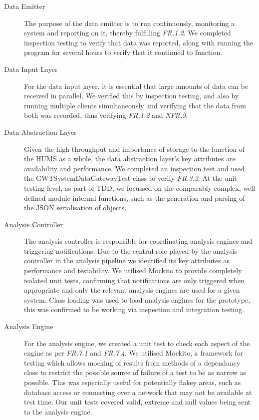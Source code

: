 \documentclass[10pt,a4paper]{article}
\newcommand{\frit}[1]{\textit{FR.#1}}
\newcommand{\nfrit}[1]{\textit{NFR.#1}}
\begin{document}
\begin{description}

  \item[Data Emitter] The purpose of the data emitter is to run
    continuously, monitoring a system and reporting on it, thereby
    fulfilling \frit{1.2}. We completed inspection testing to verify 
    that data was reported, along with running the program for 
    several hours to verify that it continued to function.

  \item[Data Input Layer] For the data input layer, it is essential that large
    amounts of data can be received in parallel. We verified this by
    inspection testing, and also by running multiple clients simultaneously and
    verifying that the data from both was recorded, thus verifying \frit{1.2}
    and \nfrit{9}.

  \item[Data Abstraction Layer] Given the high throughput and
    importance of storage to the function of the HUMS as a whole, the
    data abstraction layer's key attributes are availability and
    performance. We completed an inspection test and used the 
    GWTSystemDataGatewayTest class to verify \frit{3.2}. At the unit 
    testing level, as  part of TDD, we focussed on the comparably complex,
    well defined module-internal functions, such as the generation and 
    parsing of the JSON serialisation of objects.
    
  \item[Analysis Controller] The analysis controller is responsible for 
   coordinating analysis engines and triggering notifications. Due to 
   the central role played by the analysis controller in the analysis 
   pipeline we identified its key attributes as performance and testability. 
   We utilised Mockito to provide completely isolated unit tests, 
   confirming that notifications are only triggered when appropriate and  
   only the relevant analysis engines are used for a given system. 
   Class loading was used to load analysis engines for the prototype, 
   this was confirmed to be working via inspection and integration testing.
  
  \item[Analysis Engine]
   For the analysis engine, we created a unit test to check each aspect of the 
   engine as per \frit{7.1} and \frit{7.4}. We utilised Mockito, a framework 
   for testing which allows mocking of results from methods of a dependancy 
   class to restrict the possible source of failure of a test to be as narrow as 
   possible. This was especially useful for potentially flakey areas, such as 
   database access or connecting over a network that may not be available at 
   test time. Our unit tests covered valid, extreme and null values being sent 
   to the analysis engine.


\end{description}
\end{document}

